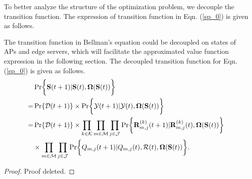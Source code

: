 To better analyze the structure of the optimization problem, we decouple the transition function.
The expression of transition function in Eqn. (\ref{sp_0}) is given as follows.
\begin{lemma}
    The transition function in Bellman's equation could be decoupled on states of APs and edge servers, which will facilitate the approximated value function expression in the following section.
    The decoupled transition function for Eqn. (\ref{sp_0}) is given as follows.
    \begin{align}
        & \Pr\Brace{ \Stat({t+1})|\Stat({t}), \Policy(\Stat({t})) }
        \nonumber\\
        =& \Pr\{\mathcal{D}({t+1})\} \times \Pr\Brace{ \Obsv({t+1})|\Obsv({t}), \Policy(\Stat({t}))}
        \nonumber\\
        =& \Pr\{\mathcal{D}({t+1})\} \times \prod_{k\in\apSet}\prod_{m\in\esSet}\prod_{j\in\jSpace}
                \Pr\Brace{
                    \vec{R}^{(k)}_{m,j}({t+1}) | \vec{R}^{(k)}_{m,j}({t}),
                    \Policy(\Stat({t}))
                }  
            \nonumber\\
            & \times \prod_{m\in\esSet}\prod_{j\in\jSpace}
                \Pr\Brace{
                    Q_{m,j}({t+1})|Q_{m,j}({t}), \mathcal{R}({t}), \Policy(\Stat({t}))
                }.
    \end{align}
\end{lemma}
\begin{proof}
    Proof deleted.
\end{proof}

